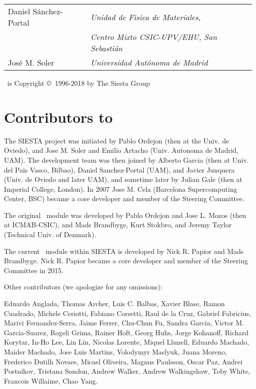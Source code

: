 \begin{titlepage}
\begin{center}
\begin{tabular}{ll}
  Daniel S\'anchez-Portal &
  \textit{Unidad de F\'{\i}sica de Materiales,} \\
  &
  \textit{Centro Mixto CSIC-UPV/EHU, San Sebasti\'an} \\
  
  Jos\'e M. Soler &
  \textit{Universidad Aut\'onoma de Madrid} \\
   
\end{tabular}
 
\vspace{0.5cm}

\siesta\ is Copyright \copyright\ 1996-2018 by The Siesta Group

\end{center}

\end{titlepage}


\newpage

\section*{Contributors to \siesta}

The SIESTA project was initiated by Pablo Ordejon (then at the Univ. de
Oviedo), and Jose M. Soler and Emilio Artacho (Univ. Autonoma de Madrid,
UAM).  The development team was then joined by Alberto Garcia (then at
Univ. del Pais Vasco, Bilbao), Daniel Sanchez-Portal (UAM), and
Javier Junquera (Univ. de Oviedo and later UAM), and sometime later by
Julian Gale (then at Imperial College, London). In 2007 Jose M. Cela
(Barcelona Supercomputing Center, BSC) became a core developer and
member of the Steering Committee.

The original \tsiesta\ module was developed by
Pablo Ordejon and Jose L. Mozos (then at ICMAB-CSIC), and Mads Brandbyge,
Kurt Stokbro, and Jeremy Taylor (Technical Univ. of Denmark).

The current \tsiesta\ module within SIESTA is developed by 
Nick R. Papior and Mads Brandbyge. Nick R. Papior became a core
developer and member of the Steering Committee in 2015.

Other contributors (we apologize for any omissions):

Eduardo Anglada,
Thomas Archer,
Luis C. Balbas,
Xavier Blase,
Ramon Cuadrado,
Michele Ceriotti,
Fabiano Corsetti,
Raul de la Cruz,
Gabriel Fabricius,
Marivi Fernandez-Serra,
Jaime Ferrer,
Chu-Chun Fu,
Sandra Garcia,
Victor M. Garcia-Suarez,
Rogeli Grima,
Rainer Hoft,
Georg Huhs,
Jorge Kohanoff,
Richard Korytar,
In-Ho Lee,
Lin Lin,
Nicolas Lorente,
Miquel Llunell,
Eduardo Machado,
Maider Machado,
Jose Luis Martins,
Volodymyr Maslyuk,
Juana Moreno,
Frederico Dutilh Novaes, 
Micael Oliveira,
Magnus Paulsson,
Oscar Paz,
Andrei Postnikov,
Tristana Sondon,
Andrew Walker,
Andrew Walkingshaw,
Toby White,
Francois Willaime,
Chao Yang.


